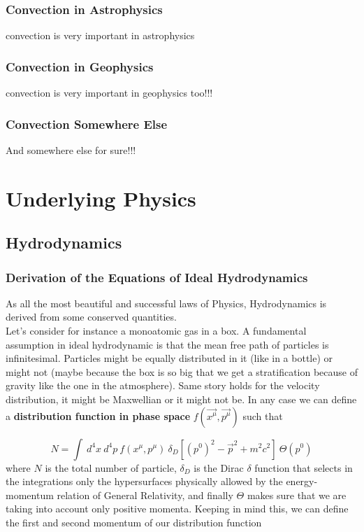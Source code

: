 \documentclass[11pt]{article}
\begin{document}
\subsubsection{Convection in Astrophysics}
convection is very important in astrophysics
\subsubsection{Convection in Geophysics}
convection is very important in geophysics too!!! 
\subsubsection{Convection Somewhere Else}
And somewhere else for sure!!!


\section{Underlying Physics}
\subsection{Hydrodynamics}
\subsubsection{Derivation of the Equations of Ideal Hydrodynamics}
As all the most beautiful and successful laws of Physics, Hydrodynamics is derived from some conserved quantities. \\
Let's consider for instance a monoatomic gas in a box. A fundamental assumption in ideal hydrodynamic is that the mean free path of particles is infinitesimal. Particles might be equally distributed in it (like in a bottle) or might not (maybe because the box is so big that we get a stratification because of gravity like the one in the atmosphere). Same story holds for the velocity distribution, it might be Maxwellian or it might not be. 
In any case we can define a \textbf{distribution function in phase space} $f( \vec{x^{\mu}}, \vec{p^{\mu}})$ such that

$$N=\int \ d^4x \ d^4p \ f( x^{\mu}, p^{\mu}) \  \delta_D[(p^0)^2-\vec{p}^2+m^2c^2] \  \Theta(p^0)$$ 
 where $N$ is the total number of particle, $\delta_D$ is the Dirac $\delta$ function that selects in the integrations only the hypersurfaces physically allowed by the energy-momentum relation of General Relativity, and finally $\Theta$ makes sure that we are taking into account only positive momenta. 
Keeping in mind this, we can define the first and second momentum of our distribution function
\end{document}
